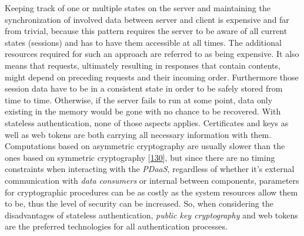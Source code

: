 \documentclass[12pt,english,a4paper,titlepage,cleardoublepage=empty,dottedtoc]{report}
\begin{document}
Keeping track of one or multiple states on the server and maintaining
the synchronization of involved data between server and client is
expensive and far from trivial, because this pattern requires the server
to be aware of all current states (sessions) and has to have them
accessible at all times. The additional resources required for such an
approach are referred to as being expensive. It also means that
requests, ultimately resulting in responses that contain contents, might
depend on preceding requests and their incoming order. Furthermore those
session data have to be in a consistent state in order to be safely
stored from time to time. Otherwise, if the server fails to run at some
point, data only existing in the memory would be gone with no chance to
be recovered. With stateless authentication, none of those aspects
applies. Certificates and keys as well as web tokens are both carrying
all necessary information with them. Computations based on asymmetric
cryptography are usually slower than the ones based on symmetric
cryptography
{[}\protect\hyperlink{ref-book_2014_chapter-10-5-asym-random-number-gen}{130}{]},
but since there are no timing constraints when interacting with the
\emph{PDaaS}, regardless of whether it's external communication with
\emph{data consumers} or internal between components, parameters for
cryptographic procedures can be as costly as the system resources allow
them to be, thus the level of security can be increased. So, when
considering the disadvantages of stateless authentication, \emph{public
key cryptography} and web tokens are the preferred technologies for all
authentication processes.
\end{document}
